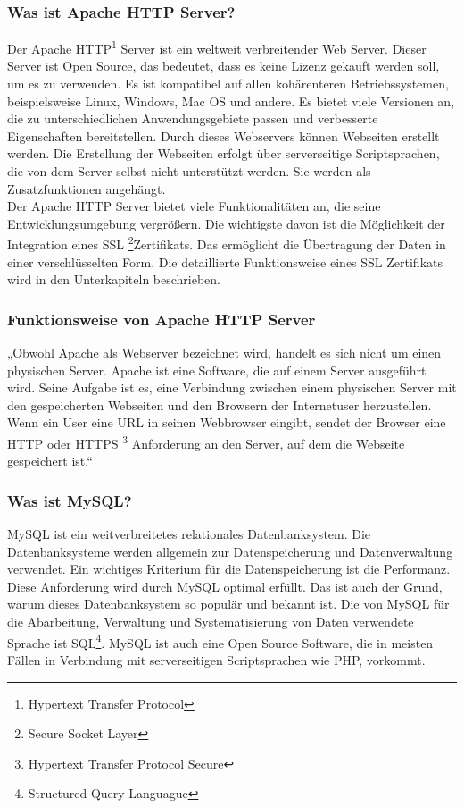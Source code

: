 \subsubsection{Was ist Apache HTTP Server?} 
Der Apache HTTP\footnote{Hypertext Transfer Protocol} Server ist ein weltweit verbreitender Web Server. Dieser Server ist Open Source, das bedeutet, dass es keine Lizenz gekauft werden soll, um es zu verwenden. Es ist kompatibel auf allen kohärenteren Betriebssystemen, beispielsweise Linux, Windows, Mac OS und andere. Es bietet viele Versionen an, die zu unterschiedlichen Anwendungsgebiete passen und verbesserte Eigenschaften bereitstellen. Durch dieses Webservers können Webseiten erstellt werden. Die Erstellung der Webseiten erfolgt über serverseitige Scriptsprachen, die von dem Server selbst nicht unterstützt werden. Sie werden als Zusatzfunktionen angehängt. \\
Der Apache HTTP Server bietet viele Funktionalitäten an, die seine Entwicklungsumgebung vergrößern. Die wichtigste davon ist die Möglichkeit der Integration eines SSL \footnote{Secure Socket Layer}Zertifikats. Das ermöglicht die Übertragung der Daten in einer verschlüsselten Form. Die detaillierte Funktionsweise eines SSL Zertifikats wird in den Unterkapiteln beschrieben.  \cite{50_apache}
\subsubsection{Funktionsweise von Apache HTTP Server} 
„Obwohl Apache als Webserver bezeichnet wird, handelt es sich nicht um einen physischen Server. Apache ist eine Software, die auf einem Server ausgeführt wird. Seine Aufgabe ist es, eine Verbindung zwischen einem physischen Server mit den gespeicherten Webseiten und den Browsern der Internetuser herzustellen. \\
Wenn ein User eine URL in seinen Webbrowser eingibt, sendet der Browser eine HTTP oder HTTPS \footnote{Hypertext Transfer Protocol Secure} Anforderung an den Server, auf dem die Webseite gespeichert ist.“ \cite{50_apache} \\

\subsubsection{Was ist MySQL?} 
MySQL ist ein weitverbreitetes relationales Datenbanksystem. Die Datenbanksysteme werden allgemein zur Datenspeicherung und Datenverwaltung verwendet. Ein wichtiges Kriterium für die Datenspeicherung ist die Performanz. Diese Anforderung wird durch MySQL optimal erfüllt. Das ist auch der Grund, warum dieses Datenbanksystem so populär und bekannt ist. Die von MySQL für die Abarbeitung, Verwaltung und Systematisierung von Daten verwendete Sprache ist SQL\footnote{Structured Query Languague}. MySQL ist auch eine Open Source Software,
die in meisten Fällen in Verbindung mit serverseitigen Scriptsprachen wie PHP, vorkommt. \cite{50_mysql}

